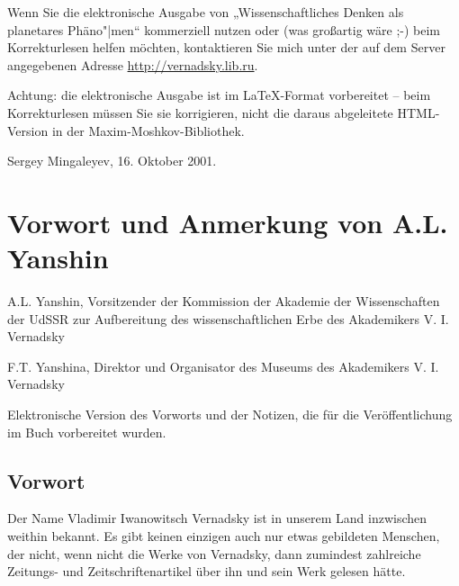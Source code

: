 \documentclass[11pt,a4paper]{article}
\begin{document}
Wenn Sie die elektronische Ausgabe von „Wissenschaftliches Denken als
planetares Phäno"|men“ kommerziell nutzen oder (was großartig wäre ;-) beim
Korrekturlesen helfen möchten, kontaktieren Sie mich unter der auf dem Server
angegebenen Adresse \url{http://vernadsky.lib.ru}.

Achtung: die elektronische Ausgabe ist im \LaTeX-Format vorbereitet -- beim
Korrekturlesen müssen Sie sie korrigieren, nicht die daraus abgeleitete
HTML-Version in der Maxim-Moshkov-Bibliothek.

\begin{flushright}
  Sergey Mingaleyev, 16. Oktober 2001. 
\end{flushright}

\section{Vorwort und Anmerkung von A.L. Yanshin}

A.L. Yanshin, Vorsitzender der Kommission der Akademie der Wissenschaften der
UdSSR zur Aufbereitung des wissenschaftlichen Erbe des Akademikers
V. I. Vernadsky

F.T. Yanshina, Direktor und Organisator des Museums des Akademikers
V. I. Vernadsky

Elektronische Version des Vorworts und der Notizen, die für die
Veröffentlichung im Buch \cite{Vernadsky1991} vorbereitet wurden.

\subsection{Vorwort}

Der Name Vladimir Iwanowitsch Vernadsky ist in unserem Land inzwischen weithin
bekannt. Es gibt keinen einzigen auch nur etwas gebildeten Menschen, der
nicht, wenn nicht die Werke von Vernadsky, dann zumindest zahlreiche Zeitungs-
und Zeitschriftenartikel über ihn und sein Werk gelesen hätte.
\end{document}
